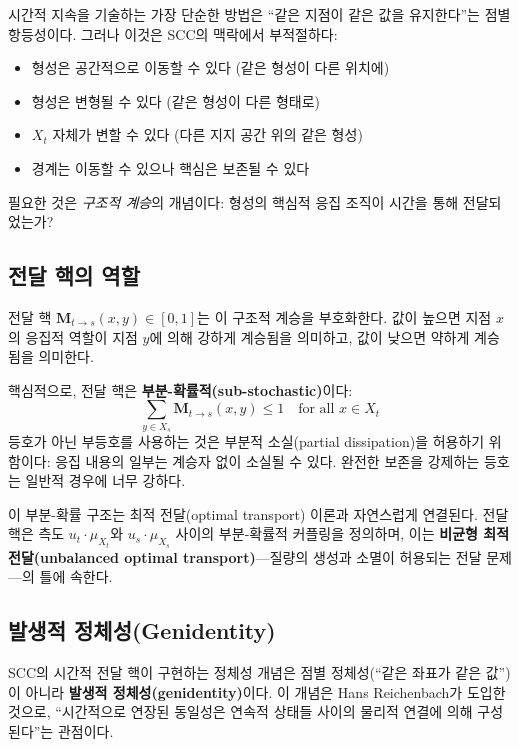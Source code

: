 시간적 지속을 기술하는 가장 단순한 방법은 ``같은 지점이 같은 값을 유지한다''는 점별 항등성이다. 그러나 이것은 SCC의 맥락에서 부적절하다:
\begin{itemize}
    \item 형성은 공간적으로 이동할 수 있다 (같은 형성이 다른 위치에)
    \item 형성은 변형될 수 있다 (같은 형성이 다른 형태로)
    \item $X_t$ 자체가 변할 수 있다 (다른 지지 공간 위의 같은 형성)
    \item 경계는 이동할 수 있으나 핵심은 보존될 수 있다
\end{itemize}

필요한 것은 \emph{구조적 계승}의 개념이다: 형성의 핵심적 응집 조직이 시간을 통해 전달되었는가?


\subsection{전달 핵의 역할}

전달 핵 $\mathbf{M}_{t \to s}(x,y) \in [0,1]$는 이 구조적 계승을 부호화한다. 값이 높으면 지점 $x$의 응집적 역할이 지점 $y$에 의해 강하게 계승됨을 의미하고, 값이 낮으면 약하게 계승됨을 의미한다.

핵심적으로, 전달 핵은 \textbf{부분-확률적(sub-stochastic)}이다:
\begin{equation}
    \sum_{y \in X_s} \mathbf{M}_{t \to s}(x,y) \leq 1 \quad \text{for all } x \in X_t
    \label{eq:sub-stochastic}
\end{equation}
등호가 아닌 부등호를 사용하는 것은 부분적 소실(partial dissipation)을 허용하기 위함이다: 응집 내용의 일부는 계승자 없이 소실될 수 있다. 완전한 보존을 강제하는 등호는 일반적 경우에 너무 강하다.

이 부분-확률 구조는 최적 전달(optimal transport) 이론과 자연스럽게 연결된다. 전달 핵은 측도 $u_t \cdot \mu_{X_t}$와 $u_s \cdot \mu_{X_s}$ 사이의 부분-확률적 커플링을 정의하며, 이는 \textbf{비균형 최적 전달(unbalanced optimal transport)}---질량의 생성과 소멸이 허용되는 전달 문제---의 틀에 속한다.


\subsection{발생적 정체성(Genidentity)}

SCC의 시간적 전달 핵이 구현하는 정체성 개념은 점별 정체성(``같은 좌표가 같은 값'')이 아니라 \textbf{발생적 정체성(genidentity)}이다. 이 개념은 Hans Reichenbach가 도입한 것으로, ``시간적으로 연장된 동일성은 연속적 상태들 사이의 물리적 연결에 의해 구성된다''는 관점이다.

